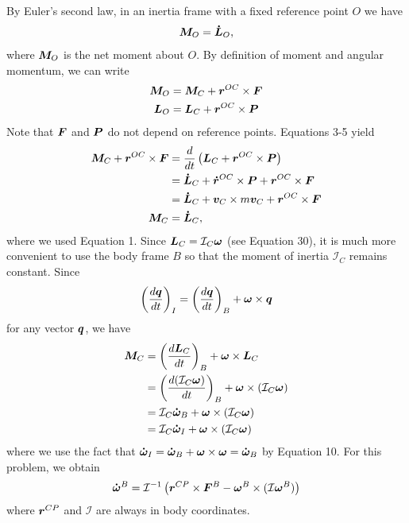 \documentclass[12pt]{article}
\begin{document}
\begin{problem}[1]
By Euler's second law, in an inertia frame with a fixed reference point $ O$ we have
\begin{align}
	{\bm{ M}}_O = {\bm{ \dot{L}}}_O,
\end{align}
where $ {\bm{ M}}_O$ is the net moment about $ O$. By definition of moment and angular momentum, we can write
\begin{align}
	{\bm{M}}_O &= {\bm{ M}}_{C} + {\bm{ r}}^{OC} \times {\bm{ F}} \\
	{\bm{ L}}_O &= {\bm{ L}}_C + {\bm{ r}}^{OC} \times {\bm{ P}}  
\end{align}
Note that $ {\bm{ F}} $ and $ {\bm{ P}} $ do not depend on reference points. Equations 3-5 yield
\begin{align}
	{\bm{ M}}_C + {\bm{ r}}^{OC} \times {\bm{ F}}  &= \frac{d }{d t} \left( {\bm{ L}}_C + {\bm{ r}}^{OC} \times {\bm{ P}}  \right)   \\ 
	&= {\bm{ \dot{L}}}_C + {\bm{ \dot{r}}}^{OC} \times {\bm{ P}}  + {\bm{ r}}^{OC} \times {\bm{ F}}  \\
	&= {\bm{ \dot{L}}}_C + {\bm{ v}}_C \times m{\bm{ v}}_C  + {\bm{ r}}^{OC} \times {\bm{ F}}  \\
	{\bm{ M}}_C &= {\bm{ \dot{L}}}_C  ,
\end{align}
where we used Equation 1. Since $ {\bm{ L}}_C = \mathcal{ I}_C {\bm{ \omega}} $ (see Equation 30), it is much more convenient to use the body frame $ B$ so that the moment of inertia $ \mathcal{ I}_C$ remains constant. Since
\begin{align}
	\left(\frac{d {\bm{ q}} }{d t}\right)_I = \left( \frac{d {\bm{ q}} }{d t}  \right)_B + {\bm{ \omega}} \times {\bm{ q}}
\end{align}
for any vector $ {\bm{ q}} $, we have
\begin{align}
	{\bm{ M}}_C &= \left( \frac{d {\bm{ L}}_C }{d t}  \right)_B + {\bm{ \omega}} \times {\bm{ L}}_C  \\  
		&= \left( \frac{d (\mathcal{ I}_C {\bm{\omega}})}{d t}  \right)_B + {\bm{ \omega}} \times ( \mathcal{ I}_C {\bm{ \omega}} )   \\
	&= \mathcal{ I}_C {\bm{ \dot{\omega}}}_{B}+ {\bm{ \omega}} \times ( \mathcal{ I}_C {\bm{ \omega}} )\\
	&= \mathcal{ I}_C {\bm{ \dot{\omega}}}_{I} + {\bm{ \omega}} \times ( \mathcal{ I}_C {\bm{ \omega}} ) 
\end{align}
where we use the fact that $ {\bm{ \dot{\omega}}} _{I} = {\bm{ \dot{\omega}}}_{B}  + {\bm{ \omega}} \times {\bm{ \omega}} = {\bm{ \dot{\omega}}}_{B}   $ by Equation 10. For this problem, we obtain
\begin{align}
	{\bm{ \dot{\omega}}}^{B} = \mathcal{ I}^{-1} \left({\bm{ r}}^{CP} \times {\bm{ F}}^{B} - {\bm{ \omega}}^{B} \times ( \mathcal{ I} {\bm{ \omega}}^{B} ) \right)
\end{align}
where $ {\bm{ r}}^{CP} $ and $ \mathcal{ I}$ are always in body coordinates.

\end{problem}
\end{document}

